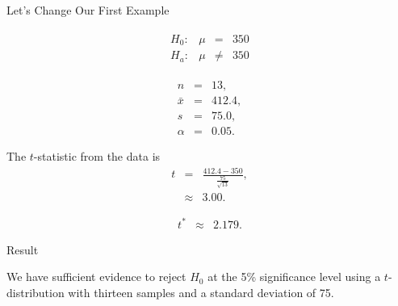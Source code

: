 \begin{frame}{Let's Change Our First Example}


    \begin{eqnarray*}
      \begin{array}{lrcl}
        H_0: & \mu & = & 350 \\
        H_a: & \mu & \neq & 350
      \end{array}
    \end{eqnarray*}

    \begin{eqnarray*}
      n & = & 13, \\
      \bar{x} & = & 412.4,\\
      s      & = & 75.0, \\
      \alpha & = & 0.05.
    \end{eqnarray*}

    \vfill 

    The $t$-statistic from the data is
    \begin{eqnarray*}
      t & = & \frac{412.4-350}{\frac{75}{\sqrt{13}}}, \\
        & \approx & 3.00.
    \end{eqnarray*}


    \begin{eqnarray*}
      t^* & \approx & 2.179.
    \end{eqnarray*}

\end{frame}


\begin{frame}{Result}

  We have sufficient evidence to reject $H_0$ at the 5\% significance
  level using a $t$-distribution with thirteen samples and a standard
  deviation of 75.
  
\end{frame}




